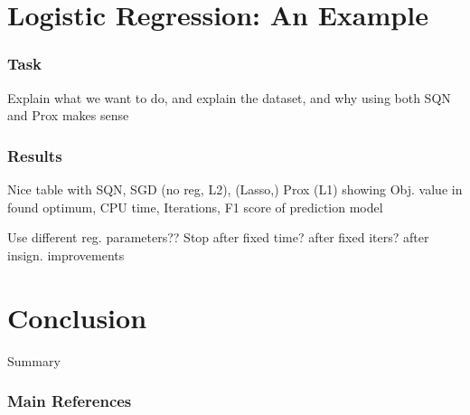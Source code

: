 \documentclass[10pt]{beamer}
\begin{document}
\section{Logistic Regression: An Example}
  \begin{frame}\frametitle{Task}
    Explain what we want to do, and explain the dataset,
    and why using both SQN and Prox makes sense   
  \end{frame}

  \begin{frame}\frametitle{Results}
    Nice table with SQN, SGD (no reg, L2), (Lasso,) Prox (L1) showing
    Obj. value in found optimum, CPU time, Iterations, F1 score of prediction model

    Use different reg. parameters??
    Stop after fixed time? after fixed iters? after insign. improvements  
  \end{frame}

\section{Conclusion}

  \begin{frame}{Summary}
    \begin{center}\ccbysa\end{center}
  \end{frame}
  


  \begin{frame}[allowframebreaks]\frametitle{Main References}

    
    

  \end{frame}
\end{document}
